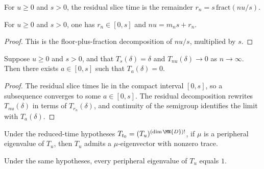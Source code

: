\begin{definition}
    \label{def:residual_slice_time_ch12}
    \leanok
    For $u\ge0$ and $s>0$, the residual slice time is the remainder
    $r_n=s\,\mathrm{fract}\!\left(nu/s\right)$.
\end{definition}

\begin{theorem}
    \label{thm:residual_slice_decomp_ch12}
    \leanok
    For $u\ge0$ and $s>0$, one has $r_n\in[0,s]$ and $nu=m_ns+r_n$.
\end{theorem}

\begin{proof}
    \leanok
    This is the floor-plus-fraction decomposition of $nu/s$, multiplied by $s$.
\end{proof}

\begin{theorem}
    \label{thm:exists_residual_time_eq_zero_ch12}
    \leanok
    Suppose $u\ge0$ and $s>0$, and that $T_s(\delta)=\delta$ and
    $T_{nu}(\delta)\to0$ as $n\to\infty$.
    Then there exists $a\in[0,s]$ such that $T_a(\delta)=0$.
\end{theorem}

\begin{proof}
    \leanok
    The residual slice times lie in the compact interval $[0,s]$, so a subsequence converges
    to some $a\in[0,s]$. The residual decomposition rewrites $T_{nu}(\delta)$ in terms of
    $T_{r_n}(\delta)$, and continuity of the semigroup identifies the limit with $T_a(\delta)$.
\end{proof}

\begin{theorem}
    \label{thm:exists_trace_ne_zero_eigenvector_of_fraction_slice_ch12}
    \leanok
    Under the reduced-time hypotheses
    $T_{t_0}=(T_u)^{(\dim \MN{D})!}$, if
    $\mu$ is a peripheral eigenvalue of $T_u$, then $T_u$ admits a
    $\mu$-eigenvector with nonzero trace.
\end{theorem}

\begin{theorem}
    \label{thm:peripheral_eq_one_of_fraction_slice_ch12}
    \leanok
    Under the same hypotheses, every peripheral eigenvalue of $T_u$
    equals $1$.
\end{theorem}

